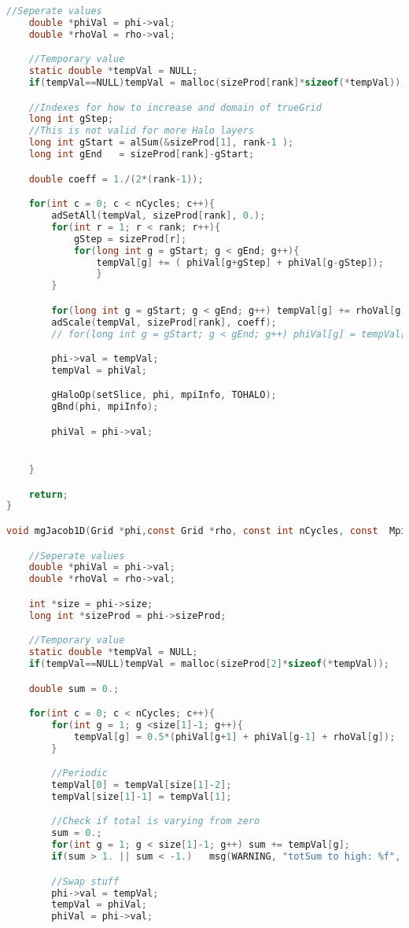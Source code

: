 \begin{lstlisting}[language=c, caption = main routine]
	//Seperate values
	double *phiVal = phi->val;
	double *rhoVal = rho->val;

	//Temporary value
	static double *tempVal = NULL;
	if(tempVal==NULL)tempVal = malloc(sizeProd[rank]*sizeof(*tempVal));

	//Indexes for how to increase and domain of trueGrid
	long int gStep;
	//This is not valid for more Halo layers
	long int gStart = alSum(&sizeProd[1], rank-1 );
	long int gEnd 	= sizeProd[rank]-gStart;

	double coeff = 1./(2*(rank-1));

	for(int c = 0; c < nCycles; c++){
		adSetAll(tempVal, sizeProd[rank], 0.);
		for(int r = 1; r < rank; r++){
			gStep = sizeProd[r];
			for(long int g = gStart; g < gEnd; g++){
				tempVal[g] += (	phiVal[g+gStep] + phiVal[g-gStep]);
				}
		}

		for(long int g = gStart; g < gEnd; g++) tempVal[g] += rhoVal[g];
		adScale(tempVal, sizeProd[rank], coeff);
		// for(long int g = gStart; g < gEnd; g++) phiVal[g] = tempVal[g];

		phi->val = tempVal;
        tempVal = phiVal;

		gHaloOp(setSlice, phi, mpiInfo, TOHALO);
		gBnd(phi, mpiInfo);

		phiVal = phi->val;


	}

	return;
}

void mgJacob1D(Grid *phi,const Grid *rho, const int nCycles, const  MpiInfo *mpiInfo){

	//Seperate values
	double *phiVal = phi->val;
	double *rhoVal = rho->val;

	int *size = phi->size;
	long int *sizeProd = phi->sizeProd;

	//Temporary value
	static double *tempVal = NULL;
	if(tempVal==NULL)tempVal = malloc(sizeProd[2]*sizeof(*tempVal));

	double sum = 0.;

	for(int c = 0; c < nCycles; c++){
		for(int g = 1; g <size[1]-1; g++){
			tempVal[g] = 0.5*(phiVal[g+1] + phiVal[g-1] + rhoVal[g]);
		}

		//Periodic
		tempVal[0] = tempVal[size[1]-2];
		tempVal[size[1]-1] = tempVal[1];

		//Check if total is varying from zero
		sum = 0.;
		for(int g = 1; g < size[1]-1; g++) sum += tempVal[g];
		if(sum > 1. || sum < -1.)	msg(WARNING, "totSum to high: %f", sum);

		//Swap stuff
		phi->val = tempVal;
		tempVal = phiVal;
		phiVal = phi->val;


\end{lstlisting}
